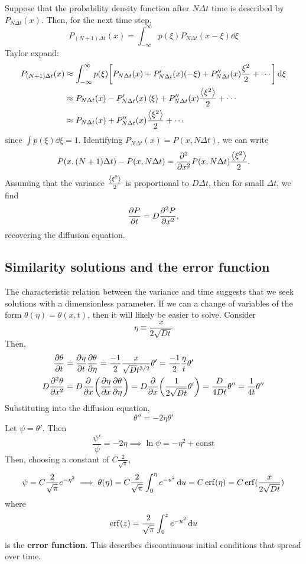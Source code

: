\documentclass[a4paper]{article}
\begin{document}
Suppose that the probability density function after \( N\Delta t \) time is described by \( P_{N \Delta t}(x) \).
Then, for the next time step,
\[
	P_{(N+1)\Delta t}(x) = \int_{-\infty}^\infty p(\xi) P_{N \Delta t}(x - \xi) \dd{\xi}
\]
Taylor expand:
\begin{align*}
	P_{(N+1)\Delta t}(x) & \approx \int_{-\infty}^\infty p(\xi) \qty[P_{N \Delta t}(x) + P_{N \Delta t}'(x)(-\xi) + P_{N \Delta t}''(x)\frac{\xi^2}{2} + \cdots] \,\mathrm{d}{\xi} \\
	                     & \approx P_{N \Delta t}(x) - P_{N \Delta t}'(x) \left\langle{\xi}\right\rangle + P_{N \Delta t}''(x) \frac{\left\langle{\xi^2}\right\rangle}{2} + \cdots                              \\
	                     & \approx P_{N \Delta t}(x) + P_{N \Delta t}''(x) \frac{\left\langle{\xi^2}\right\rangle}{2} + \cdots
\end{align*}
since \( \int p(\xi) \dd{\xi} = 1 \).
Identifying \( P_{N \Delta t}(x) = P(x, N\Delta t) \), we can write
\[
	P(x, (N+1)\Delta t) - P(x, N \Delta t) = \pdv[2]{x} P(x, N\Delta t) \frac{\left\langle{\xi^2}\right\rangle}{2}.
\]
Assuming that the variance \( \frac{\left\langle{\xi^2}\right\rangle}{2} \) is proportional to \( D \Delta t \), then for small \( \Delta t \), we find
\[
	\pdv{P}{t} = D \pdv[2]{P}{x},
\]
recovering the diffusion equation.

\subsection{Similarity solutions and the error function}
The characteristic relation between the variance and time suggests that we seek solutions with a dimensionless parameter.
If we can a change of variables of the form \( \theta(\eta) = \theta(x,t) \), then it will likely be easier to solve.
Consider
\[
	\eta \equiv \frac{x}{2\sqrt{Dt}}
\]
Then,
\begin{align*}
    \pdv{\theta}{t} &= \pdv{\eta}{t} \pdv{\theta}{\eta} = \frac{-1}{2} \frac{x}{\sqrt{D} t^{3/2}} \theta' = \frac{-1}{2} \frac{\eta}{t} \theta'\\ 
    D \pdv[2]{\theta}{x} &= D \pdv{x} \qty(\pdv{\eta}{x} \pdv{\theta}{\eta}) = D \pdv{x} \qty(\frac{1}{2\sqrt{Dt}} \theta') = \frac{D}{4Dt} \theta'' = \frac{1}{4t} \theta''
\end{align*}
Substituting into the diffusion equation,
\[
	\theta'' = -2 \eta \theta'
\]
Let \( \psi = \theta' \).
Then
\[
	\frac{\psi'}{\psi} = -2\eta \implies \ln \psi = -\eta^2 + \text{const}
\]
Then, choosing a constant of \( C\frac{2}{\sqrt{\pi}} \),
\[
	\psi = C\frac{2}{\sqrt{\pi}} e^{-\eta^2} \implies \theta(\eta) = C\frac{2}{\sqrt{\pi}} \int_0^\eta e^{-u^2} \dd{u} = C \erf(\eta) = C \erf(\frac{x}{2\sqrt{Dt}})
\]
where
\[
	\erf(z) = \frac{2}{\sqrt{\pi}} \int_0^z e^{-u^2} \dd{u}
\]
is the \textbf{error function}. 
This describes discontinuous initial conditions that spread over time.
\end{document}
